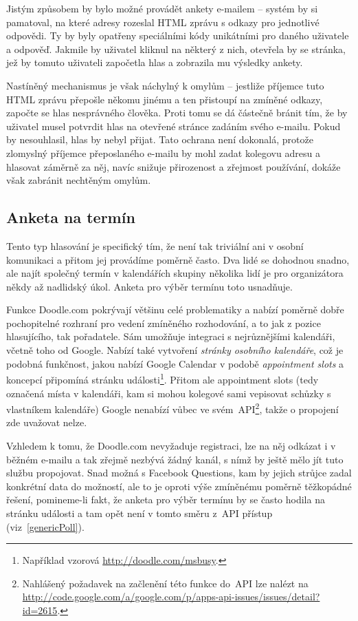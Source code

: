 \documentclass[12pt,oneside,final]{fithesis2}
\begin{document}
Jistým způsobem by bylo možné provádět ankety e-mailem -- systém by si pamatoval, na které adresy rozeslal HTML zprávu s odkazy pro jednotlivé odpovědi. Ty by byly opatřeny speciálními kódy unikátními pro daného uživatele a odpověď. Jakmile by uživatel kliknul na některý z nich, otevřela by se stránka, jež by tomuto uživateli započetla hlas a zobrazila mu výsledky ankety.

Nastíněný mechanismus je však náchylný k omylům -- jestliže příjemce tuto HTML zprávu přepošle někomu jinému a ten přistoupí na zmíněné odkazy, započte se hlas nesprávného člověka. Proti tomu se dá částečně bránit tím, že by uživatel musel potvrdit hlas na otevřené stránce zadáním svého e-mailu. Pokud by nesouhlasil, hlas by nebyl přijat. Tato ochrana není dokonalá, protože zlomyslný příjemce přeposlaného e-mailu by mohl zadat kolegovu adresu a hlasovat záměrně za něj, navíc snižuje přirozenost a zřejmost používání, dokáže však zabránit nechtěným omylům.

\subsection{Anketa na termín}\label{datePoll}
Tento typ hlasování je specifický tím, že není tak triviální ani v osobní komunikaci a přitom jej provádíme poměrně často. Dva lidé se dohodnou snadno, ale najít společný termín v kalendářích skupiny několika lidí je pro organizátora někdy až nadlidský úkol. Anketa pro výběr termínu toto usnadňuje.

Funkce Doodle.com pokrývají většinu celé problematiky a nabízí poměrně dobře pochopitelné rozhraní pro vedení zmíněného rozhodování, a to jak z pozice hlasujícího, tak pořadatele. Sám umožňuje integraci s nejrůznějšími kalendáři, včetně toho od Google. Nabízí také vytvoření \emph{stránky osobního kalendáře}, což je podobná funkčnost, jakou nabízí Google Calendar v podobě \emph{appointment slots} a koncepcí připomíná stránku události\footnote{Například vzorová \url{http://doodle.com/msbusy}.}. Přitom ale appointment slots (tedy označená místa v kalendáři, kam si mohou kolegové sami vepisovat schůzky s vlastníkem kalendáře) Google nenabízí vůbec ve svém~API\footnote{Nahlášený požadavek na začlenění této funkce do~API lze nalézt na \url{http://code.google.com/a/google.com/p/apps-api-issues/issues/detail?id=2615}.}, takže o propojení zde uvažovat nelze.

Vzhledem k tomu, že Doodle.com nevyžaduje registraci, lze na něj odkázat i v běžném e-mailu a tak zřejmě nezbývá žádný kanál, s nímž by ještě mělo jít tuto službu propojovat. Snad možná s Facebook Questions, kam by jejich strůjce zadal konkrétní data do možností, ale to je oproti výše zmíněnému poměrně těžkopádné řešení, pomineme-li fakt, že anketa pro výběr termínu by se často hodila na stránku události a tam opět není v tomto směru z~API přístup (viz~\ref{genericPoll}).
\end{document}

